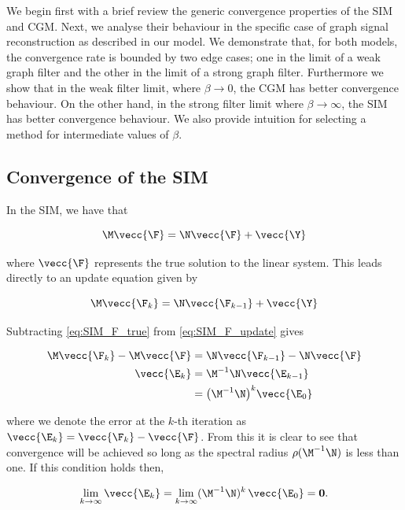 We begin first with a brief review the generic convergence properties of the SIM and CGM. Next, we analyse their behaviour in the specific case of graph signal reconstruction as described in our model. We demonstrate that, for both models, the convergence rate is bounded by two edge cases; one in the limit of a weak graph filter and the other in the limit of a strong graph filter. Furthermore we show that in the weak filter limit, where $\beta \rightarrow 0$, the CGM has better convergence behaviour. On the other hand, in the strong filter limit where $\beta \rightarrow \infty$, the SIM has better convergence behaviour. We also provide intuition for selecting a method for intermediate values of $\beta$. 


\subsection{Convergence of the SIM}
\label{sec:SIM_convergence}

In the SIM, we have that 

\begin{equation}
    \label{eq:SIM_F_true}
\M \vecc{\F} =  \N \vecc{\F} + \vecc{\Y}
\end{equation}

where $\vecc{\F}$ represents the true solution to the linear system. This leads directly to an update equation given by

\begin{equation}
    \label{eq:SIM_F_update}
\M \vecc{\F_k} = \N \vecc{\F_{k-1}} + \vecc{\Y}
\end{equation}

Subtracting \cref{eq:SIM_F_true} from \cref{eq:SIM_F_update} gives

\begin{align}
    \M \vecc{\F_k} - \M \vecc{\F} &= \N \vecc{\F_{k-1}} - \N \vecc{\F}  \notag \\
    \vecc{\E_k} &= \M^{-1} \N \vecc{\E_{k-1}} \notag \\
     &= \big( \M^{-1} \N \big)^{k} \vecc{\E_{0}}
\end{align}

where we denote the error at the $k$-th iteration as $\vecc{\E_k} = \vecc{\F_k} - \vecc{\F}$. From this it is clear to see that convergence will be achieved so long as the spectral radius $\rho(\M^{-1}\N)$ is less than one. If this condition holds then,

\begin{equation}
    \lim_{k \rightarrow \infty} \vecc{\E_{k}} = \lim_{k \rightarrow \infty} (\M^{-1} \N)^{k} \, \vecc{\E_0} = \mathbf{0} .
\end{equation}

